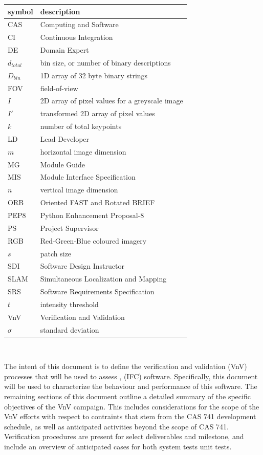 \documentclass[12pt, titlepage]{article}
\begin{document}
\renewcommand{\arraystretch}{1.2}
\begin{tabular}{l l} 
  \toprule		
  \textbf{symbol} & \textbf{description}\\
  \midrule
  CAS & Computing and Software\\
  CI & Continuous Integration\\
  DE & Domain Expert \\
  $d_{total}$ & bin size, or number of binary descriptions \\
  $D_{bin}$ & 1D array of 32 byte binary strings \\
  FOV & field-of-view\\
  $I$ & 2D array of pixel values for a greyscale image \\
  $I'$ & transformed 2D array of pixel values\\
  $k$ & number of total keypoints\\
  LD & Lead Developer \\
  $m$ & horizontal image dimension\\
  MG & Module Guide \\
  MIS & Module Interface Specification\\
  $n$ & vertical image dimension\\
  ORB & Oriented FAST and Rotated BRIEF\\
  PEP8 & Python Enhancement Proposal-8\\
  PS & Project Supervisor\\
  RGB & Red-Green-Blue coloured imagery\\
  $s$ & patch size\\
  SDI & Software Design Instructor\\
  SLAM & Simultaneous Localization and Mapping\\
  SRS & Software Requirements Specification\\
  $t$ & intensity threshold \\
  VnV & Verification and Validation\\
  $\sigma$ & standard deviation\\
  \bottomrule
\end{tabular}\\

\newpage

\noindent The intent of this document is to define the verification and validation (VnV) processes
that will be used to assess \progname, (IFC) software. Specifically, this document will be used to 
characterize the behaviour and performance of this software. The remaining sections of this document 
outline a detailed summary of the specific objectives of the VnV campaign. This includes considerations 
for the scope of the VnV efforts with respect to contraints that stem from the CAS 741 
development schedule, as well as anticipated activities beyond the scope of CAS 741.
Verification procedures are present for select deliverables and milestone, and include 
an overview of anticipated cases for both system tests unit tests.
\end{document}
